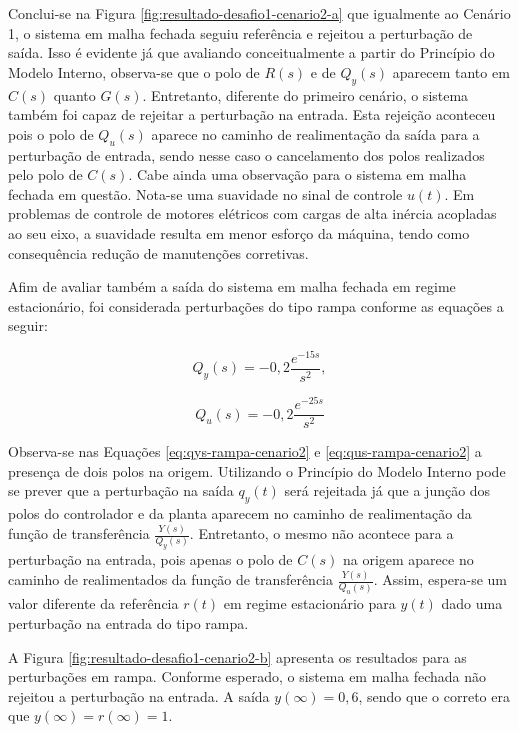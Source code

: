 Conclui-se na Figura \ref{fig:resultado-desafio1-cenario2-a} que igualmente ao
Cenário 1, o sistema em malha fechada seguiu referência e rejeitou a perturbação
de saída. Isso é evidente já que avaliando conceitualmente a partir do Princípio
do Modelo Interno, observa-se que o polo de $R(s)$ e de $Q_{y}(s)$ aparecem
tanto em $C(s)$ quanto $G(s)$. Entretanto, diferente do primeiro cenário, o
sistema também foi capaz de rejeitar a perturbação na entrada. Esta rejeição
aconteceu pois o polo de $Q_{u}(s)$ aparece no caminho de realimentação da saída
para a perturbação de entrada, sendo nesse caso o cancelamento dos polos
realizados pelo polo de $C(s)$. Cabe ainda uma observação para o sistema em
malha fechada em questão. Nota-se uma suavidade no sinal de controle $u(t)$. Em
problemas de controle de motores elétricos com cargas de alta inércia acopladas
ao seu eixo, a suavidade resulta em menor esforço da máquina, tendo como
consequência redução de manutenções corretivas.

Afim de avaliar também a saída do sistema em malha fechada em regime
estacionário, foi considerada perturbações do tipo rampa conforme as equações
a seguir:

\begin{equation}
    \label{eq:qys-rampa-cenario2}
    Q_{y}(s) = -0,2\frac{e^{-15s}}{s^2},
\end{equation}

\begin{equation}
    \label{eq:qus-rampa-cenario2}
    Q_{u}(s) = -0,2\frac{e^{-25s}}{s^{2}}
\end{equation}

Observa-se nas Equações \ref{eq:qys-rampa-cenario2} e
\ref{eq:qus-rampa-cenario2} a presença de dois polos na origem. Utilizando o
Princípio do Modelo Interno pode se prever que a perturbação na saída $q_{y}(t)$
será rejeitada já que a junção dos polos do controlador e da planta aparecem no
caminho de realimentação da função de transferência $\frac{Y(s)}{Q_{y}(s)}$.
Entretanto, o mesmo não acontece para a perturbação na entrada, pois apenas o
polo de $C(s)$ na origem aparece no caminho de realimentados da função de
transferência $\frac{Y(s)}{Q_{u}(s)}$. Assim, espera-se um valor diferente da
referência $r(t)$ em regime estacionário para $y(t)$ dado uma perturbação na
entrada do tipo rampa.

A Figura \ref{fig:resultado-desafio1-cenario2-b} apresenta os resultados para as
perturbações em rampa. Conforme esperado, o sistema em malha fechada não
rejeitou a perturbação na entrada. A saída $y(\infty) = 0,6$, sendo que o correto
era que $y(\infty) = r(\infty) = 1$.

